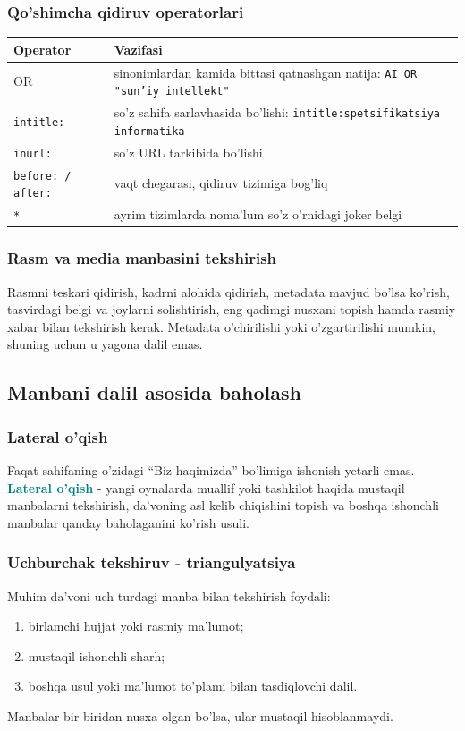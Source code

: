 \documentclass[11pt,a4paper,oneside]{book}
\newcommand{\term}[1]{\textbf{\textcolor{Teal}{#1}}\index{#1}}
\newcommand{\code}[1]{\texttt{#1}}
\begin{document}
\subsubsection{Qo'shimcha qidiruv operatorlari}
\begin{tabularx}{\textwidth}{>{\ttfamily}p{}X}
\toprule
Operator & Vazifasi\\
\midrule
\textnormal{OR} & sinonimlardan kamida bittasi qatnashgan natija: \code{AI OR "sun'iy intellekt"}\\
\code{intitle:} & so'z sahifa sarlavhasida bo'lishi: \code{intitle:spetsifikatsiya informatika}\\
\code{inurl:} & so'z URL tarkibida bo'lishi\\
\code{before: / after:} & vaqt chegarasi, qidiruv tizimiga bog'liq\\
\code{*} & ayrim tizimlarda noma'lum so'z o'rnidagi joker belgi\\
\bottomrule
\end{tabularx}

\subsubsection{Rasm va media manbasini tekshirish}
Rasmni teskari qidirish, kadrni alohida qidirish, metadata mavjud bo'lsa ko'rish, tasvirdagi belgi va joylarni solishtirish, eng qadimgi nusxani topish hamda rasmiy xabar bilan tekshirish kerak. Metadata o'chirilishi yoki o'zgartirilishi mumkin, shuning uchun u yagona dalil emas.
\subsection{Manbani dalil asosida baholash}
\subsubsection{Lateral o'qish}
Faqat sahifaning o'zidagi “Biz haqimizda” bo'limiga ishonish yetarli emas. \term{Lateral o'qish} - yangi oynalarda muallif yoki tashkilot haqida mustaqil manbalarni tekshirish, da'voning asl kelib chiqishini topish va boshqa ishonchli manbalar qanday baholaganini ko'rish usuli.

\subsubsection{Uchburchak tekshiruv - triangulyatsiya}
Muhim da'voni uch turdagi manba bilan tekshirish foydali:
\begin{enumerate}
\item birlamchi hujjat yoki rasmiy ma'lumot;
\item mustaqil ishonchli sharh;
\item boshqa usul yoki ma'lumot to'plami bilan tasdiqlovchi dalil.
\end{enumerate}
Manbalar bir-biridan nusxa olgan bo'lsa, ular mustaqil hisoblanmaydi.
\end{document}
